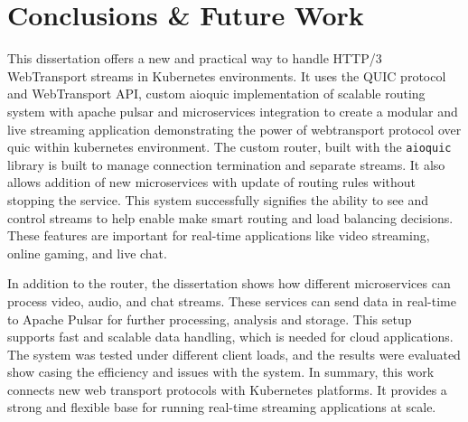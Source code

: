 






\chapter{Conclusions \& Future Work}
\label{chap:Conclusions}

This dissertation offers a new and practical way to handle HTTP/3 WebTransport streams in Kubernetes environments. It uses the QUIC protocol and WebTransport API, custom aioquic implementation of scalable routing system with apache pulsar and microservices integration to create a modular and live streaming application demonstrating the power of webtransport protocol over quic within kubernetes environment. The custom router, built with the \texttt{aioquic} library is built to manage connection termination and separate streams. It also allows addition of new microservices with update  of routing rules without stopping the service. This system successfully signifies the ability to see and control streams to help enable make smart routing and load balancing decisions. These features are important for real-time applications like video streaming, online gaming, and live chat.

In addition to the router, the dissertation shows how different microservices can process video, audio, and chat streams. These services can send data in real-time to Apache Pulsar for further processing, analysis and storage. This setup supports fast and scalable data handling, which is needed for cloud applications. The system was tested under different client loads, and the results were evaluated show casing the efficiency and issues with the system. In summary, this work connects new web transport protocols with Kubernetes platforms. It provides a strong and flexible base for running real-time streaming applications at scale.

